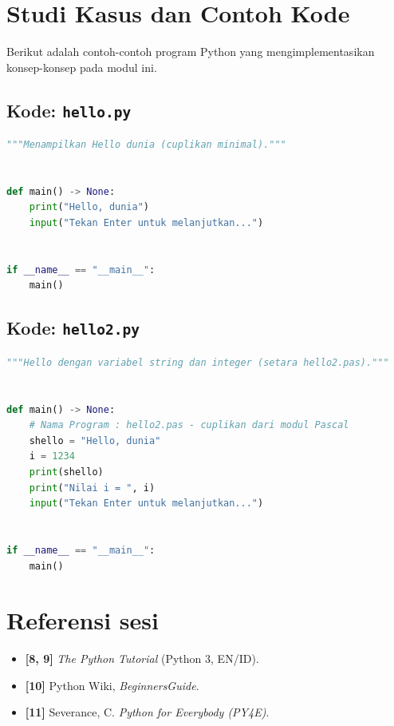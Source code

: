 \documentclass[../main.tex]{subfiles}
\begin{document}
\section{Studi Kasus dan Contoh Kode}

Berikut adalah contoh-contoh program Python yang mengimplementasikan konsep-konsep pada modul ini.

\subsection{Kode: \texttt{hello.py}}
\introstudikasuskode
\begin{lstlisting}[language=Python,caption={\texttt{hello.py}}]
"""Menampilkan Hello dunia (cuplikan minimal)."""


def main() -> None:
    print("Hello, dunia")
    input("Tekan Enter untuk melanjutkan...")


if __name__ == "__main__":
    main()
\end{lstlisting}

\subsection{Kode: \texttt{hello2.py}}
\introstudikasuskode
\begin{lstlisting}[language=Python,caption={\texttt{hello2.py}}]
"""Hello dengan variabel string dan integer (setara hello2.pas)."""


def main() -> None:
    # Nama Program : hello2.pas - cuplikan dari modul Pascal
    shello = "Hello, dunia"
    i = 1234
    print(shello)
    print("Nilai i = ", i)
    input("Tekan Enter untuk melanjutkan...")


if __name__ == "__main__":
    main()
\end{lstlisting}

\section{Referensi sesi}

\begin{itemize}[leftmargin=*]
  \item \textbf{[8, 9]} \textit{The Python Tutorial} (Python 3, EN/ID).
  \item \textbf{[10]} Python Wiki, \textit{BeginnersGuide}.
  \item \textbf{[11]} Severance, C. \textit{Python for Everybody (PY4E)}.
\end{itemize}
\end{document}
